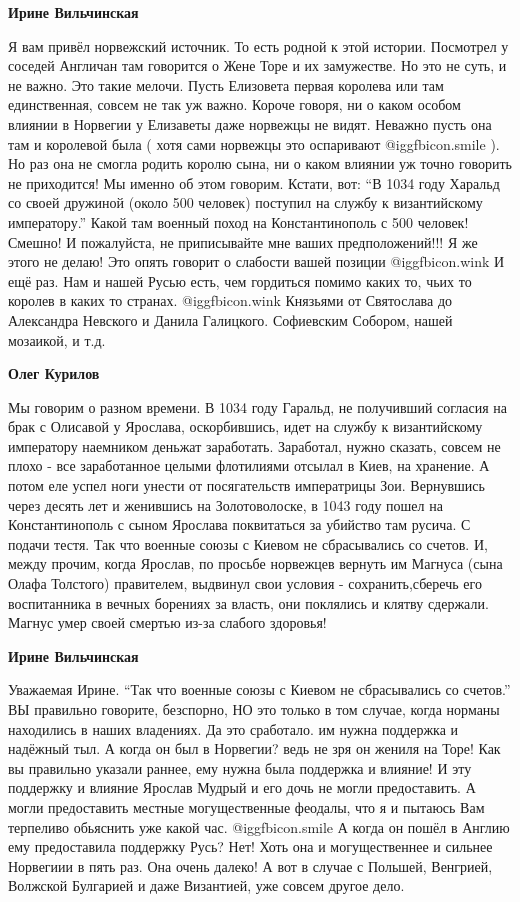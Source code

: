 \begin{itemize}
\begin{itemize}
\begin{itemize}
\textbf{Ирине Вильчинская} 

Я вам привёл норвежский источник. То есть родной к этой истории. Посмотрел у
соседей Англичан там говорится о Жене Торе и их замужестве. Но это не суть, и
не важно. Это такие мелочи. Пусть Елизовета первая королева или там
единственная, совсем не так уж важно. Короче говоря, ни о каком особом влиянии
в Норвегии у Елизаветы даже норвежцы не видят. Неважно пусть она там и
королевой была ( хотя сами норвежцы это оспаривают  @igg{fbicon.smile}  ). Но раз она не смогла
родить королю сына, ни о каком влиянии уж точно говорить не приходится! Мы
именно об этом говорим. Кстати, вот: \enquote{В 1034 году Харальд со своей дружиной
(около 500 человек) поступил на службу к византийскому императору.} Какой там
военный поход на Константинополь с 500 человек! Смешно! И пожалуйста, не
приписывайте мне ваших предположений!!! Я же этого не делаю! Это опять говорит
о слабости вашей позиции  @igg{fbicon.wink}  И ещё раз. Нам и нашей Русью есть, чем гордиться
помимо каких то, чьих то королев в каких то странах.  @igg{fbicon.wink}  Князьями от Святослава
до Александра Невского и Данила Галицкого. Софиевским Собором, нашей мозаикой,
и т.д.

\textbf{Олег Курилов} 

Мы говорим о разном времени. В 1034 году Гаральд, не получивший согласия на
брак с Олисавой у Ярослава, оскорбившись, идет на службу к византийскому
императору наемником деньжат заработать. Заработал, нужно сказать, совсем не
плохо - все заработанное целыми флотилиями отсылал в Киев, на хранение. А потом
еле успел ноги унести от посягательств императрицы Зои. Вернувшись через десять
лет и женившись на Золотоволоске, в 1043 году пошел на Константинополь с сыном
Ярослава поквитаться за убийство там русича. С подачи тестя. Так что военные
союзы с Киевом не сбрасывались со счетов. И, между прочим, когда Ярослав, по
просьбе норвежцев вернуть им Магнуса (сына Олафа Толстого) правителем, выдвинул
свои условия - сохранить,сберечь его воспитанника в вечных борениях за власть,
они поклялись и клятву сдержали. Магнус умер своей смертью из-за слабого
здоровья!

\textbf{Ирине Вильчинская} 

Уважаемая Ирине. \enquote{Так что военные союзы с Киевом не сбрасывались со счетов.} ВЫ
правильно говорите, безспорно, НО это только в том случае, когда норманы
находились в наших владениях. Да это сработало. им нужна поддержка и надёжный
тыл. А когда он был в Норвегии? ведь не зря он жениля на Торе! Как вы правильно
указали раннее, ему нужна была поддержка и влияние! И эту поддержку и влияние
Ярослав Мудрый и его дочь не могли предоставить. А могли предоставить местные
могущественные феодалы, что я и пытаюсь Вам терпеливо обьяснить уже какой час.
 @igg{fbicon.smile}  А когда он пошёл в Англию ему предоставила поддержку Русь? Нет! Хоть она и
могущественнее и сильнее Норвегиии в пять раз. Она очень далеко! А вот в случае
с Польшей, Венгрией, Волжской Булгарией и даже Византией, уже совсем другое
дело.


\end{itemize}
\end{itemize}
\end{itemize}

